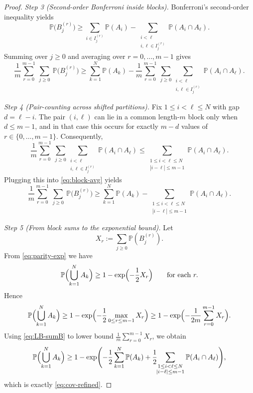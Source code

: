 \documentclass[10pt,a4paper]{amsart}
\begin{document}
\begin{proof}
\medskip
\textit{Step 3 (Second-order Bonferroni inside blocks).}
Bonferroni’s second-order inequality yields
\[
  \mathbb{P}\bigl(B^{(r)}_{j}\bigr)
  \ge
  \sum_{i\in I^{(r)}_{j}} \mathbb{P}(A_i)
  -
  \sum_{\substack{i<\ell\\ i,\ell\in I^{(r)}_{j}}} \mathbb{P}(A_i\cap A_\ell).
\]
Summing over $j\ge0$ and averaging over $r=0,\dots,m-1$ gives
\begin{equation}\label{eq:block-avg}
  \frac{1}{m}\sum_{r=0}^{m-1}\ \sum_{j\ge0}\ \mathbb{P}\bigl(B^{(r)}_{j}\bigr)
  \ge
  \sum_{k=1}^N \mathbb{P}(A_k)
  -
  \frac{1}{m}\sum_{r=0}^{m-1}\ \sum_{j\ge0}
  \sum_{\substack{i<\ell\\ i,\ell\in I^{(r)}_{j}}} \mathbb{P}(A_i\cap A_\ell).
\end{equation}

\medskip
\textit{Step 4 (Pair-counting across shifted partitions).}
Fix $1\le i<\ell\le N$ with gap $d=\ell-i$.  The pair $(i,\ell)$ can lie in
a common length-$m$ block only when $d\le m-1$, and in that case this occurs
for exactly $m-d$ values of $r\in\{0,\dots,m-1\}$.  Consequently,
\[
  \frac{1}{m}\sum_{r=0}^{m-1}\ \sum_{j\ge0}
  \sum_{\substack{i<\ell\\ i,\ell\in I^{(r)}_{j}}} \mathbb{P}(A_i\cap A_\ell)
  \le
  \sum_{\substack{1\le i<\ell\le N\\ |i-\ell|\le m-1}} \mathbb{P}(A_i\cap A_\ell).
\]
Plugging this into \eqref{eq:block-avg} yields
\begin{equation}\label{eq:LB-sumB}
  \frac{1}{m}\sum_{r=0}^{m-1}\ \sum_{j\ge0}\ \mathbb{P}\bigl(B^{(r)}_{j}\bigr)
  \ge
  \sum_{k=1}^N \mathbb{P}(A_k)
  -
  \sum_{\substack{1\le i<\ell\le N\\ |i-\ell|\le m-1}} \mathbb{P}(A_i\cap A_\ell).
\end{equation}

\medskip
\textit{Step 5 (From block sums to the exponential bound).}
Let
\[
  X_r:=\sum_{j\ge0}\mathbb{P}(B^{(r)}_{j}).
\]
From \eqref{eq:parity-exp} we have
\[
  \mathbb{P}\Bigl(\bigcup_{k=1}^N A_k\Bigr)
  \ge 1-\exp\Bigl(-\frac{1}{2}X_r\Bigr)
  \qquad\text{for each }r.
\]
Hence
\[
  \mathbb{P}\Bigl(\bigcup_{k=1}^N A_k\Bigr)
  \ge 1-\exp\Bigl(-\frac{1}{2}\max_{0\le r\le m-1} X_r\Bigr)
  \ge 1-\exp\Bigl(-\frac{1}{2m}\sum_{r=0}^{m-1} X_r\Bigr).
\]
Using \eqref{eq:LB-sumB} to lower bound
\(\frac{1}{m}\sum_{r=0}^{m-1} X_r\), we obtain
\[
  \mathbb{P}\Bigl(\bigcup_{k=1}^N A_k\Bigr)
  \ge
  1-\exp\Biggl(
   -\frac{1}{2}\sum_{k=1}^N \mathbb{P}(A_k)
   +\frac{1}{2}\!\!\sum_{\substack{1\le i<\ell\le N\\|i-\ell|\le m-1}}
   \mathbb{P}(A_i\cap A_\ell)
  \Biggr),
\]
which is exactly \eqref{eq:cov-refined}.
\end{proof}
\end{document}
